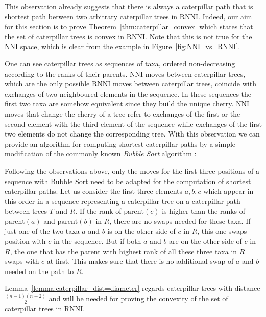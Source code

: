 \documentclass{amsart}
\newcommand{\parent}{\mathrm{parent}}
\newcommand{\nni}{\mathrm{NNI}}
\newcommand{\rnni}{\mathrm{RNNI}}
\begin{document}
This observation already suggests that there is always a caterpillar path that is shortest path between two arbitrary caterpillar trees in $\rnni$.
Indeed, our aim for this section is to prove Theorem~\ref{thm:caterpillar_convex} which states that the set of caterpillar trees is convex in $\rnni$.
Note that this is not true for the $\nni$ space, which is clear from the example in Figure~\ref{fig:NNI_vs_RNNI}.

One can see caterpillar trees as sequences of taxa, ordered non-decreasing according to the ranks of their parents.
$\nni$ moves between caterpillar trees, which are the only possible $\rnni$ moves between caterpillar trees, coincide with exchanges of two neighboured elements in the sequence.
In these sequences the first two taxa are somehow equivalent since they build the unique cherry.
$\nni$ moves that change the cherry of a tree refer to exchanges of the first or the second element with the third element of the sequence while exchanges of the first two elements do not change the corresponding tree.
With this observation we can provide an algorithm for computing shortest caterpillar paths by a simple modification of the commonly known \emph{Bubble Sort} algorithm \autocite{knuth1997}:

Following the observations above, only the moves for the first three positions of a sequence with Bubble Sort need to be adapted for the computation of shortest caterpillar paths.
Let us consider the first three elements $a,b,c$ which appear in this order in a sequence representing a caterpillar tree on a caterpillar path between trees $T$ and $R$.
If the rank of $\parent(c)$ is higher than the ranks of $\parent(a)$ and $\parent(b)$ in $R$, there are no swaps needed for these taxa.
If just one of the two taxa $a$ and $b$ is on the other side of $c$ in $R$, this one swaps position with $c$ in the sequence.
But if both $a$ and $b$ are on the other side of $c$ in $R$, the one that has the parent with highest rank of all these three taxa in $R$ swaps with $c$ at first.
This makes sure that there is no additional swap of $a$ and $b$ needed on the path to $R$.

Lemma~\ref{lemma:caterpillar_dist=diameter} regards caterpillar trees with distance $\frac{(n-1)(n-2)}{2}$ and will be needed for proving the convexity of the set of caterpillar trees in $\rnni$.
\end{document}
